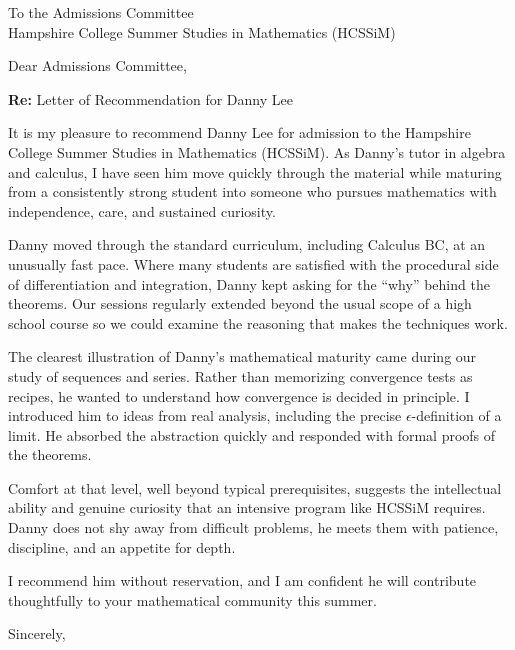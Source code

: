 \begin{letter}{To the Admissions Committee \\ Hampshire College Summer Studies in Mathematics (HCSSiM)}

\opening{Dear Admissions Committee,}

\textbf{Re:} Letter of Recommendation for Danny Lee

It is my pleasure to recommend Danny Lee for admission to the Hampshire College Summer Studies in Mathematics (HCSSiM).
As Danny's tutor in algebra and calculus, I have seen him move quickly through the material while maturing
from a consistently strong student into someone who pursues mathematics with independence, care, and sustained curiosity.

Danny moved through the standard curriculum, including Calculus BC, at an unusually fast pace.
Where many students are satisfied with the procedural side of differentiation and integration,
Danny kept asking for the ``why'' behind the theorems. Our sessions regularly extended beyond
the usual scope of a high school course so we could examine the reasoning that makes the techniques work.

The clearest illustration of Danny's mathematical maturity came during our study of sequences and series.
Rather than memorizing convergence tests as recipes, he wanted to understand how convergence is decided
in principle. I introduced him to ideas from real analysis, including the precise $\epsilon$-definition
of a limit. He absorbed the abstraction quickly and responded with formal proofs of the theorems.

Comfort at that level, well beyond typical prerequisites, suggests the intellectual ability and genuine
curiosity that an intensive program like HCSSiM requires. Danny does not shy away from difficult problems,
he meets them with patience, discipline, and an appetite for depth.

I recommend him without reservation, and I am confident he will contribute thoughtfully to your
mathematical community this summer.

\closing{Sincerely,}

\end{letter}
